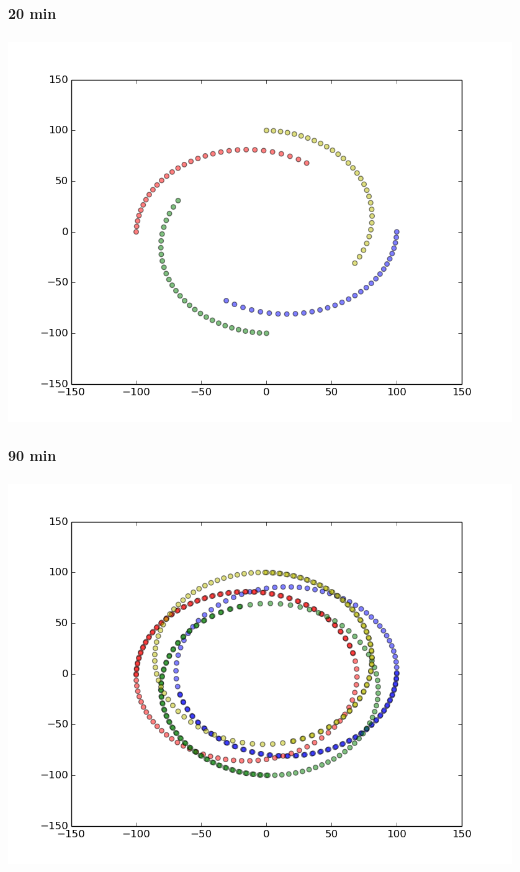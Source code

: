 \documentclass[15pt]{report}
\begin{document}
\paragraph{20 min}
\centerline{\includegraphics[scale=0.3]{./img/ex1_2}}

\paragraph{90 min}
\centerline{\includegraphics[scale=0.3]{./img/ex1_3}}
\end{document}
